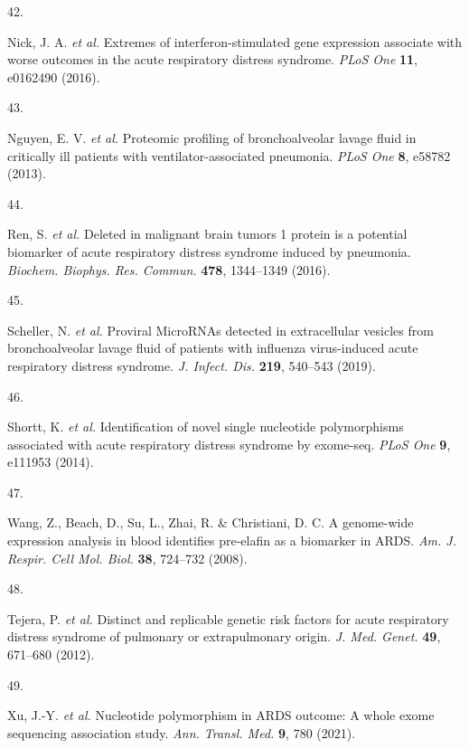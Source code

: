 \documentclass[
  11,
  a4paper,
]{article}
\newlength{\cslhangindent}
\newlength{\csllabelwidth}
\newlength{\cslentryspacingunit} %
\newenvironment{CSLReferences}[2] %
 {%
  \setlength{\parindent}{0pt}
  \ifodd #1
  \let\oldpar\par
  \def\par{\hangindent=\cslhangindent\oldpar}
  \fi
  \setlength{\parskip}{#2\cslentryspacingunit}
 }%
 {}
\newcommand{\CSLLeftMargin}[1]{\parbox[t]{\csllabelwidth}{#1}}
\newcommand{\CSLRightInline}[1]{\parbox[t]{\linewidth - \csllabelwidth}{#1}\break}
\begin{document}
\begin{CSLReferences}{0}{0}
\leavevmode{}%
\CSLLeftMargin{42. }%
\CSLRightInline{Nick, J. A. \emph{et al.} Extremes of
interferon-stimulated gene expression associate with worse outcomes in
the acute respiratory distress syndrome. \emph{PLoS One} \textbf{11},
e0162490 (2016).}

\leavevmode{}%
\CSLLeftMargin{43. }%
\CSLRightInline{Nguyen, E. V. \emph{et al.} Proteomic profiling of
bronchoalveolar lavage fluid in critically ill patients with
ventilator-associated pneumonia. \emph{PLoS One} \textbf{8}, e58782
(2013).}

\leavevmode{}%
\CSLLeftMargin{44. }%
\CSLRightInline{Ren, S. \emph{et al.} Deleted in malignant brain tumors
1 protein is a potential biomarker of acute respiratory distress
syndrome induced by pneumonia. \emph{Biochem. Biophys. Res. Commun.}
\textbf{478}, 1344--1349 (2016).}

\leavevmode{}%
\CSLLeftMargin{45. }%
\CSLRightInline{Scheller, N. \emph{et al.} Proviral {MicroRNAs} detected
in extracellular vesicles from bronchoalveolar lavage fluid of patients
with influenza virus-induced acute respiratory distress syndrome.
\emph{J. Infect. Dis.} \textbf{219}, 540--543 (2019).}

\leavevmode{}%
\CSLLeftMargin{46. }%
\CSLRightInline{Shortt, K. \emph{et al.} Identification of novel single
nucleotide polymorphisms associated with acute respiratory distress
syndrome by exome-seq. \emph{PLoS One} \textbf{9}, e111953 (2014).}

\leavevmode{}%
\CSLLeftMargin{47. }%
\CSLRightInline{Wang, Z., Beach, D., Su, L., Zhai, R. \& Christiani, D.
C. A genome-wide expression analysis in blood identifies pre-elafin as a
biomarker in {ARDS}. \emph{Am. J. Respir. Cell Mol. Biol.} \textbf{38},
724--732 (2008).}

\leavevmode{}%
\CSLLeftMargin{48. }%
\CSLRightInline{Tejera, P. \emph{et al.} Distinct and replicable genetic
risk factors for acute respiratory distress syndrome of pulmonary or
extrapulmonary origin. \emph{J. Med. Genet.} \textbf{49}, 671--680
(2012).}

\leavevmode{}%
\CSLLeftMargin{49. }%
\CSLRightInline{Xu, J.-Y. \emph{et al.} Nucleotide polymorphism in
{ARDS} outcome: A whole exome sequencing association study. \emph{Ann.
Transl. Med.} \textbf{9}, 780 (2021).}


\end{CSLReferences}
\end{document}
